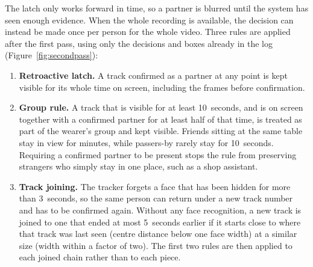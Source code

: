 The latch only works forward in time, so a partner is blurred until the system has seen
enough evidence. When the whole recording is available, the decision can instead be made
once per person for the whole video. Three rules are applied after the first pass, using
only the decisions and boxes already in the log (Figure~\ref{fig:secondpass}):
\begin{enumerate}
  \item \textbf{Retroactive latch.} A track confirmed as a partner at any point is kept
        visible for its whole time on screen, including the frames before confirmation.
  \item \textbf{Group rule.} A track that is visible for at least 10~seconds, and is on
        screen together with a confirmed partner for at least half of that time, is
        treated as part of the wearer's group and kept visible. Friends sitting at the same
        table stay in view for minutes, while passers-by rarely stay for 10~seconds.
        Requiring a confirmed partner to be present stops the rule from preserving
                strangers who simply stay in one place, such as a shop assistant.
  \item \textbf{Track joining.} The tracker forgets a face that has been hidden for more
        than 3~seconds, so the same person can return under a new track number and has to
        be confirmed again. Without any face recognition, a new track is joined to one that
        ended at most 5~seconds earlier if it starts close to where that track was last
        seen (centre distance below one face width) at a similar size (width within a
        factor of two). The first two rules are then applied to each joined chain rather
        than to each piece.
\end{enumerate}

